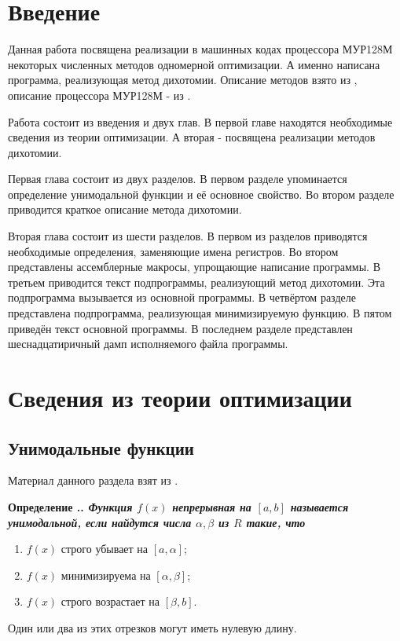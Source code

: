 \documentclass[14pt]{report}
\newcounter{defin}[section]
\renewcommand{\thedefin}{\thesection.\arabic{defin}}
\newenvironment{Definition}{\par\refstepcounter{defin}\bf Определение \thedefin.\sl}{\rm\par}
\begin{document}
\chapter*{Введение}
Данная работа посвящена реализации в машинных кодах процессора МУР128М некоторых численных методов одномерной оптимизации. А именно написана программа, реализующая метод дихотомии. Описание методов взято из \cite{Vasil'ev}, описание процессора МУР128М - из \cite{mur128}.

Работа состоит из введения и двух глав. В первой главе находятся необходимые сведения из теории оптимизации. А вторая - посвящена реализации методов дихотомии.

Первая глава состоит из двух разделов. В первом разделе упоминается определение унимодальной функции и её основное свойство. Во втором разделе приводится краткое описание метода дихотомии.

Вторая глава состоит из шести разделов. В первом из разделов приводятся необходимые определения, заменяющие имена регистров. Во втором представлены ассемблерные макросы, упрощающие написание программы. В третьем приводится текст подпрограммы, реализующий метод дихотомии. Эта подпрограмма вызывается из основной программы. В четвёртом разделе представлена подпрограмма, реализующая минимизируемую функцию. В пятом приведён текст основной программы. В последнем разделе представлен шеснадцатиричный дамп исполняемого файла программы.


\chapter{Сведения из теории оптимизации}
\section{Унимодальные функции}
Материал данного раздела взят из \cite[гл.1, опр.7]{Vasil'ev}.
\begin{Definition}\label{la1}\cite[гл.1, опр.7]{Vasil'ev}
Функция $f(x)$ непрерывная на $[a, b]$ называется унимодальной, если найдутся числа $\alpha,\beta$ из ${R}$ такие, что 
\begin{enumerate}
\item $f(x)$ строго убывает на $[a, \alpha]$;
\item $f(x)$ минимизируема на $[\alpha, \beta]$;
\item $f(x)$ строго возрастает на $[\beta, b]$.    
\end{enumerate}    
\par
Один или два из этих отрезков могут иметь нулевую длину. 
\end{Definition}
\end{document}
